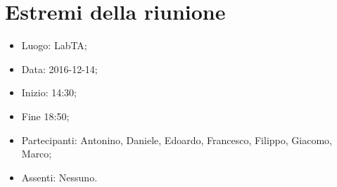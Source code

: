 \documentclass[../verbale-2016-12-14.tex]{subfiles}
\begin{document}
\section{Estremi della riunione}
	\begin{itemize}
		\item Luogo: LabTA;
		\item Data: 2016-12-14;
      \item Inizio: 14:30;
      \item Fine 18:50;
		\item Partecipanti: Antonino, Daniele, Edoardo, Francesco, Filippo, Giacomo, Marco;
      \item Assenti: Nessuno.
	\end{itemize}
\end{document}

